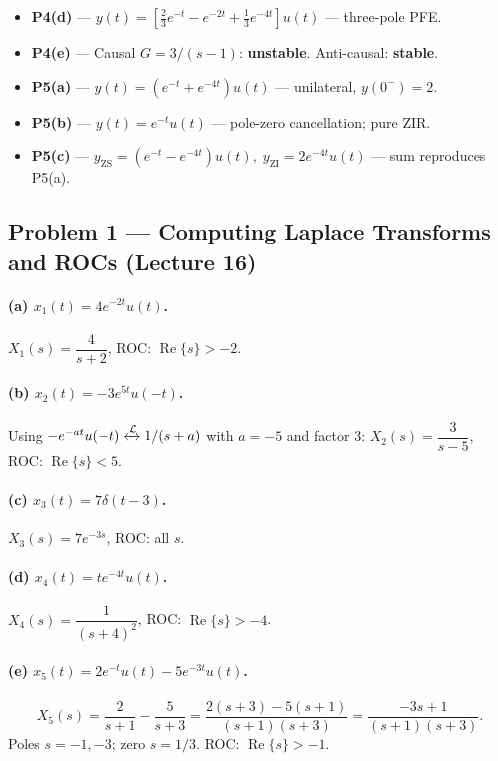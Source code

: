 \documentclass[11pt]{article}
\newcommand{\Laplace}{\xleftrightarrow{\mathcal{L}}}
\newcommand{\Real}{\operatorname{Re}}
\begin{document}
\begin{itemize}[leftmargin=*, nosep]
  \item \textbf{P4(d)} --- $\boxed{y(t) = [\tfrac{2}{3}e^{-t} - e^{-2t} + \tfrac{1}{3}e^{-4t}]u(t)}$ --- three-pole PFE.
  \item \textbf{P4(e)} --- Causal $G=3/(s-1)$: \textbf{unstable}. Anti-causal: \textbf{stable}.
  \item \textbf{P5(a)} --- $\boxed{y(t) = (e^{-t}+e^{-4t})u(t)}$ --- unilateral, $y(0^-)=2$.
  \item \textbf{P5(b)} --- $\boxed{y(t) = e^{-t}u(t)}$ --- pole-zero cancellation; pure ZIR.
  \item \textbf{P5(c)} --- $\boxed{y_{\text{ZS}}=(e^{-t}-e^{-4t})u(t),\; y_{\text{ZI}}=2e^{-4t}u(t)}$ --- sum reproduces P5(a).
\end{itemize}

\subsection{Problem 1 --- Computing Laplace Transforms and ROCs (Lecture 16)}

\paragraph{(a) $x_1(t)=4e^{-2t}u(t)$.} $X_1(s) = \dfrac{4}{s+2}$, ROC: $\Real\{s\}>-2$.

\paragraph{(b) $x_2(t)=-3e^{5t}u(-t)$.} Using $-e^{-at}u(-t) \Laplace 1/(s+a)$ with $a=-5$ and factor 3: $X_2(s) = \dfrac{3}{s-5}$, ROC: $\Real\{s\}<5$.

\paragraph{(c) $x_3(t) = 7\delta(t-3)$.} $X_3(s) = 7 e^{-3s}$, ROC: all $s$.

\paragraph{(d) $x_4(t) = t e^{-4t}u(t)$.} $X_4(s) = \dfrac{1}{(s+4)^2}$, ROC: $\Real\{s\}>-4$.

\paragraph{(e) $x_5(t) = 2e^{-t}u(t) - 5 e^{-3t}u(t)$.}
\[
X_5(s) = \frac{2}{s+1}-\frac{5}{s+3} = \frac{2(s+3)-5(s+1)}{(s+1)(s+3)} = \frac{-3s+1}{(s+1)(s+3)}.
\]
Poles $s=-1,-3$; zero $s=1/3$. ROC: $\Real\{s\}>-1$.
\end{document}
